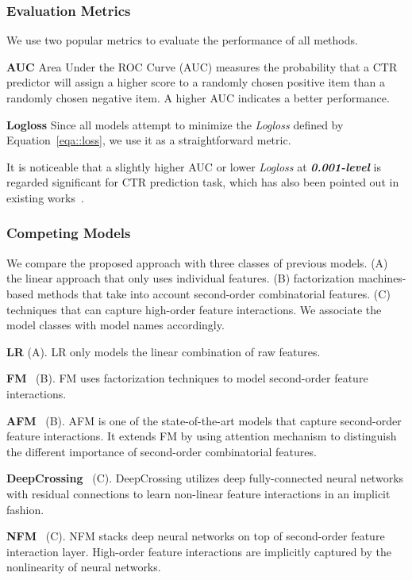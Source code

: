 \subsubsection{Evaluation Metrics}
We use two popular metrics to evaluate the performance of all methods.

\textbf{AUC} Area Under the ROC Curve (AUC) measures the probability that a CTR predictor will assign a higher score to a randomly chosen positive item than a randomly chosen negative item. A higher AUC indicates a better performance.

\textbf{Logloss} Since all models attempt to minimize the \textit{Logloss} defined by Equation~\ref{eqa::loss}, we use it as a straightforward metric.

It is noticeable that a slightly higher AUC or lower \textit{Logloss} at \textit{\textbf{0.001-level}} is regarded significant for CTR prediction task, which has also been pointed out in existing works~\cite{cheng2016wide,guo2017deepfm,wang2017deep}.

\subsubsection{Competing Models} We compare the proposed approach with three classes of previous models. (A) the linear approach that only uses individual features. (B) factorization machines-based methods that take into account second-order combinatorial features. (C) techniques that can capture high-order feature interactions. We associate the model classes with model names accordingly.

\textbf{LR} (A). LR only models the linear combination of raw features.  

\textbf{FM}~\cite{rendle2010factorization} (B). FM uses factorization techniques to model second-order feature interactions.

\textbf{AFM}~\cite{xiao2017attentional} (B). AFM is one of the state-of-the-art models that capture second-order feature interactions. It extends FM by using attention mechanism to distinguish the different importance of second-order combinatorial features.

\textbf{DeepCrossing}~\cite{shan2016deep} (C). DeepCrossing utilizes deep fully-connected neural networks with residual connections to learn non-linear feature interactions in an implicit fashion.

\textbf{NFM}~\cite{he2017neural} (C). NFM stacks deep neural networks on top of second-order feature interaction layer. High-order feature interactions are implicitly captured by the nonlinearity of neural networks.

